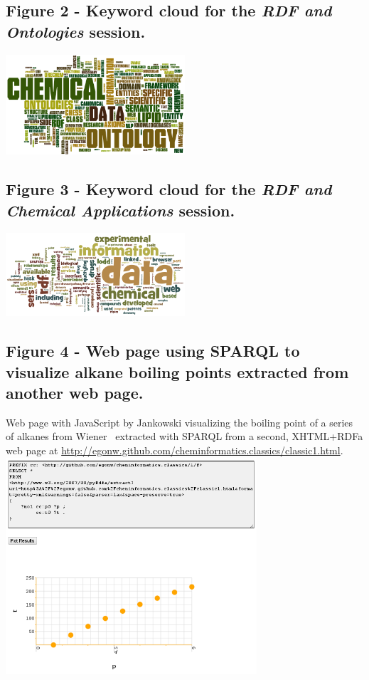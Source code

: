 \documentclass[10pt]{bmc_article}
\newenvironment{bmcformat}{\begin{raggedright}\baselineskip20pt\sloppy\setboolean{publ}{false}}{\end{raggedright}\baselineskip20pt\sloppy}
\begin{document}
\begin{bmcformat}
  \subsection*{Figure 2 - Keyword cloud for the \textit{RDF and Ontologies} session.}
  \includegraphics[width=0.5\textwidth]{graphics/wordle_cinf0031} 

  \subsection*{Figure 3 - Keyword cloud for the \textit{RDF and Chemical Applications} session.}
  \includegraphics[width=0.5\textwidth]{graphics/wordle_cinf0032} 

  \subsection*{Figure 4 - Web page using SPARQL to visualize alkane boiling points extracted
    from another web page.}
  Web page with JavaScript by Jankowski visualizing the boiling point of a series of
  alkanes from Wiener~\cite{Wiener1947} extracted with SPARQL from a second, XHTML+RDFa web page at
  \url{http://egonw.github.com/cheminformatics.classics/classic1.html}.
  \includegraphics[width=0.7\textwidth]{graphics/sparqlGraphing1} 


\end{bmcformat}
\end{document}
